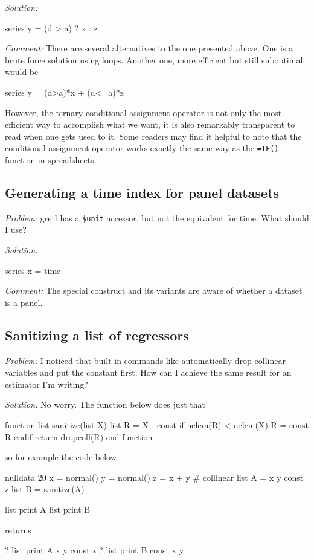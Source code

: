 \emph{Solution:}
\begin{code}
series y = (d > a) ? x : z
\end{code}

\emph{Comment:} There are several alternatives to the one presented
above. One is a brute force solution using loops. Another one, more
efficient but still suboptimal, would be
\begin{code}
series y = (d>a)*x + (d<=a)*z
\end{code}
However, the ternary conditional assignment operator is not only the
most efficient way to accomplish what we want, it is also remarkably
transparent to read when one gets used to it. Some readers may find it
helpful to note that the conditional assignment operator works exactly
the same way as the \texttt{=IF()} function in spreadsheets.

\subsection{Generating a time index for panel datasets}

\emph{Problem:} gretl has a \texttt{\$unit} accessor, but not
the equivalent for time. What should I use?

\emph{Solution:}
\begin{code}
series x = time
\end{code}

\emph{Comment:} The special construct  and its variants
are aware of whether a dataset is a panel.

\subsection{Sanitizing a list of regressors}

\emph{Problem:} I noticed that built-in commands like 
automatically drop collinear variables and put the constant first. How
can I achieve the same result for an estimator I'm writing?

\emph{Solution:}
No worry. The function below does just that
\begin{code}
function list sanitize(list X)
    list R = X - const
    if nelem(R) < nelem(X)
        R = const R
    endif
    return dropcoll(R)
end function
\end{code}
so for example the code below
\begin{code}
nulldata 20
x = normal()
y = normal()
z = x + y # collinear
list A = x y const z
list B = sanitize(A)

list print A
list print B
\end{code}
returns
\begin{code}
? list print A
x y const z
? list print B
const x y
\end{code}

